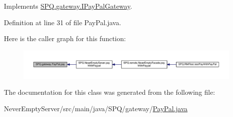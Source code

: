 Implements \mbox{\hyperlink{interface_s_p_q_1_1gateway_1_1_i_pay_pal_gateway_a064ef641b0db9c4a6d0de59089a108bf}{S\+P\+Q.\+gateway.\+I\+Pay\+Pal\+Gateway}}.



Definition at line 31 of file Pay\+Pal.\+java.

Here is the caller graph for this function\+:\nopagebreak
\begin{figure}[H]
\begin{center}
\leavevmode
\includegraphics[width=350pt]{class_s_p_q_1_1gateway_1_1_pay_pal_a4f12e3d9fd7cc1ebf54e885df464f1d4_icgraph}
\end{center}
\end{figure}


The documentation for this class was generated from the following file\+:\begin{DoxyCompactItemize}
\item 
Never\+Empty\+Server/src/main/java/\+S\+P\+Q/gateway/\mbox{\hyperlink{_pay_pal_8java}{Pay\+Pal.\+java}}\end{DoxyCompactItemize}
